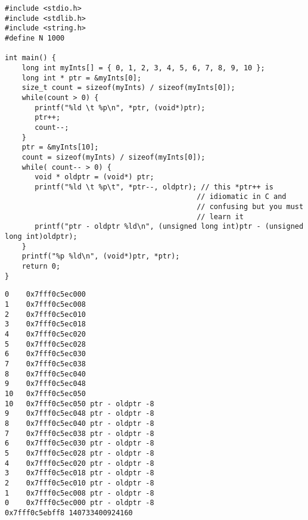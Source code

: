 \documentclass[11pt]{article}
\begin{document}
\begin{verbatim}
#include <stdio.h>
#include <stdlib.h>
#include <string.h>
#define N 1000

int main() {
    long int myInts[] = { 0, 1, 2, 3, 4, 5, 6, 7, 8, 9, 10 };
    long int * ptr = &myInts[0];
    size_t count = sizeof(myInts) / sizeof(myInts[0]);
    while(count > 0) {
       printf("%ld \t %p\n", *ptr, (void*)ptr);
       ptr++;
       count--;
    }
    ptr = &myInts[10];
    count = sizeof(myInts) / sizeof(myInts[0]);
    while( count-- > 0) {
       void * oldptr = (void*) ptr;
       printf("%ld \t %p\t", *ptr--, oldptr); // this *ptr++ is
                                             // idiomatic in C and
                                             // confusing but you must
                                             // learn it
       printf("ptr - oldptr %ld\n", (unsigned long int)ptr - (unsigned long int)oldptr);
    }
    printf("%p %ld\n", (void*)ptr, *ptr);
    return 0;
}
\end{verbatim}

\begin{verbatim}
0 	 0x7fff0c5ec000
1 	 0x7fff0c5ec008
2 	 0x7fff0c5ec010
3 	 0x7fff0c5ec018
4 	 0x7fff0c5ec020
5 	 0x7fff0c5ec028
6 	 0x7fff0c5ec030
7 	 0x7fff0c5ec038
8 	 0x7fff0c5ec040
9 	 0x7fff0c5ec048
10 	 0x7fff0c5ec050
10 	 0x7fff0c5ec050	ptr - oldptr -8
9 	 0x7fff0c5ec048	ptr - oldptr -8
8 	 0x7fff0c5ec040	ptr - oldptr -8
7 	 0x7fff0c5ec038	ptr - oldptr -8
6 	 0x7fff0c5ec030	ptr - oldptr -8
5 	 0x7fff0c5ec028	ptr - oldptr -8
4 	 0x7fff0c5ec020	ptr - oldptr -8
3 	 0x7fff0c5ec018	ptr - oldptr -8
2 	 0x7fff0c5ec010	ptr - oldptr -8
1 	 0x7fff0c5ec008	ptr - oldptr -8
0 	 0x7fff0c5ec000	ptr - oldptr -8
0x7fff0c5ebff8 140733400924160
\end{verbatim}
\end{document}
